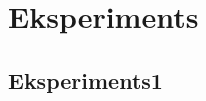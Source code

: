 \documentclass[singlespacing, latexmargins]{ludis}
\begin{document}
\chapter{Eksperiments}


\section{Eksperiments1}







% 


% 
\end{document}

